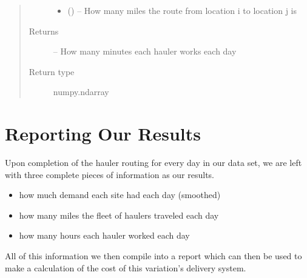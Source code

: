 \documentclass[letterpaper,10pt,english]{sphinxmanual}
\begin{document}
\begin{fulllineitems}
\begin{quote}
\begin{description}
\begin{itemize}
\item {} 
 () -- How many miles the route from location i to location j is

\end{itemize}

\item[{Returns}] \leavevmode
{} -- How many minutes each hauler works each day

\item[{Return type}] \leavevmode
numpy.ndarray

\end{description}\end{quote}

\end{fulllineitems}



\chapter{Reporting Our Results}
\label{\detokenize{reporting:reporting}}\label{\detokenize{reporting::doc}}\label{\detokenize{reporting:reporting-our-results}}
Upon completion of the hauler routing for every day in our data set, we are
left with three complete pieces of information as our results.
\begin{itemize}
\item {} 
how much demand each site had each day (smoothed)

\item {} 
how many miles the fleet of haulers traveled each day

\item {} 
how many hours each hauler worked each day

\end{itemize}

All of this information we then compile into a report which can then be used
to make a calculation of the cost of this variation's delivery system.
\end{document}
